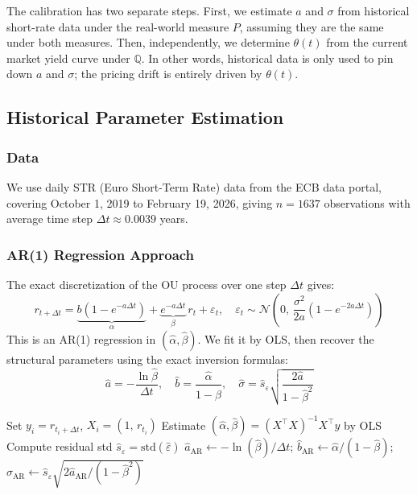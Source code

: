 \documentclass[12pt, a4paper]{article}
\newcommand{\Q}{\mathbb{Q}}
\begin{document}
The calibration has two separate steps. First, we estimate $a$ and $\sigma$ from historical short-rate data under the real-world measure $P$, assuming they are the same under both measures. Then, independently, we determine $\theta(t)$ from the current market yield curve under $\Q$. In other words, historical data is only used to pin down $a$ and $\sigma$; the pricing drift is entirely driven by $\theta(t)$.

\subsection{Historical Parameter Estimation}

\subsubsection{Data}

We use daily \texteuro STR (Euro Short-Term Rate) data from the ECB data portal, covering October 1, 2019 to February 19, 2026, giving $n = 1637$ observations with average time step $\Delta t \approx 0.0039$ years.

\subsubsection{AR(1) Regression Approach}

The exact discretization of the OU process over one step $\Delta t$ gives:
\begin{equation}
r_{t+\Delta t} = \underbrace{b(1-e^{-a\Delta t})}_{\alpha} + \underbrace{e^{-a\Delta t}}_{\beta}\,r_t + \varepsilon_t, \quad \varepsilon_t \sim \mathcal{N}\!\left(0,\, \frac{\sigma^2}{2a}(1-e^{-2a\Delta t})\right)
\end{equation}
This is an AR(1) regression in $(\hat{\alpha}, \hat{\beta})$. We fit it by OLS, then recover the structural parameters using the exact inversion formulas:
\begin{equation}
\hat{a} = -\frac{\ln\hat{\beta}}{\Delta t}, \quad \hat{b} = \frac{\hat{\alpha}}{1-\hat{\beta}}, \quad \hat{\sigma} = \hat{s}_\varepsilon\sqrt{\frac{2\hat{a}}{1-\hat{\beta}^2}}
\end{equation}

\begin{algorithm}[H]
\caption{AR(1) Estimation (exact discretization)}
\begin{algorithmic}[1]
\State Set $y_i = r_{t_i + \Delta t}$, $X_i = (1,\, r_{t_i})$
\State Estimate $(\hat{\alpha}, \hat{\beta}) = (X^\top X)^{-1} X^\top y$ by OLS
\State Compute residual std $\hat{s}_\varepsilon = \mathrm{std}(\hat{\varepsilon})$
\State $\hat{a}_{\text{AR}} \leftarrow -\ln(\hat{\beta}) / \Delta t$; \quad $\hat{b}_{\text{AR}} \leftarrow \hat{\alpha} / (1 - \hat{\beta})$; \quad $\hat{\sigma}_{\text{AR}} \leftarrow \hat{s}_\varepsilon\sqrt{2\hat{a}_{\text{AR}}/(1-\hat{\beta}^2)}$
\end{algorithmic}
\end{algorithm}
\end{document}
